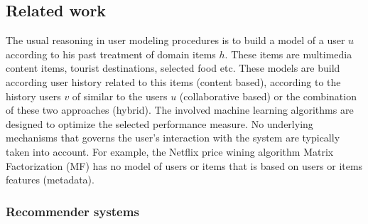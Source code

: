 \documentclass{llncs}
\begin{document}
\subsection{Related work}\label{SubSec_RelatedWork}

The usual reasoning in user modeling procedures is to build a model of a user $u$ according to his past treatment of domain items $h$. These items are multimedia content items, tourist destinations, selected food etc. These models are build according user history related to this items (content based), according to the history users $v$ of similar to the users $u$ (collaborative based) or the combination of these two approaches (hybrid). The involved machine learning algorithms are designed to optimize the selected performance measure. No underlying mechanisms that governs the user's interaction with the system are typically taken into account. For example, the Netflix price wining algorithm Matrix Factorization (MF) \cite{koren2009matrix} has no model of users or items that is based on users or items features (metadata). 

\subsubsection{Recommender systems}\label{SubSubSec_RS}
\end{document}

